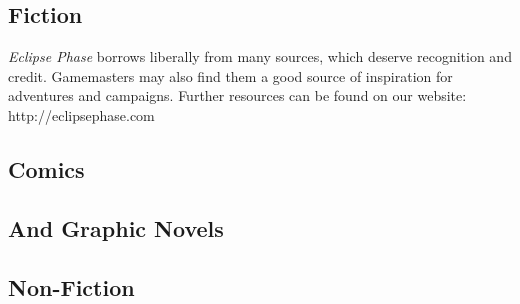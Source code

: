 
\subsection{Fiction}

\textit{Eclipse Phase} borrows liberally from many sources, which deserve recognition and credit. Gamemasters may also find them a good source of 
inspiration for adventures and campaigns. Further resources can be found on our website: http://eclipsephase.com

\subsection{Comics }


\subsection{And Graphic Novels}


\subsection{ Non-Fiction}

